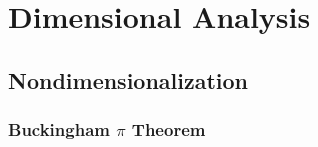 \section{Dimensional Analysis}\label{sec:dimensional_analysis}


\subsection{Nondimensionalization}\label{sec:nondimensionalization}

\subsubsection{Buckingham $\pi$ Theorem}\label{sec:buckingham_pi}
